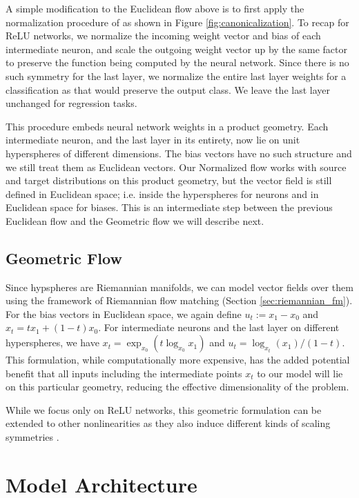 A simple modification to the Euclidean flow above is to first apply the normalization procedure of \citep{pittorinoDeepNetworksToroids2022} as shown in Figure \ref{fig:canonicalization}. To recap for ReLU networks, we normalize the incoming weight vector and bias of each intermediate neuron, and scale the outgoing weight vector up by the same factor to preserve the function being computed by the neural network. Since there is no such symmetry for the last layer, we normalize the entire last layer weights for a classification as that would preserve the output class. We leave the last layer unchanged for regression tasks. 

This procedure embeds neural network weights in a product geometry. Each intermediate neuron, and the last layer in its entirety, now lie on unit hyperspheres of different dimensions. The bias vectors have no such structure and we still treat them as Euclidean vectors. Our Normalized flow works with source and target distributions on this product geometry, but the vector field is still defined in Euclidean space; i.e. inside the hyperspheres for neurons and in Euclidean space for biases. This is an intermediate step between the previous Euclidean flow and the Geometric flow we will describe next. 

\subsection{Geometric Flow}

Since hypspheres are Riemannian manifolds, we can model vector fields over them using the framework of Riemannian flow matching \citep{chenRiemannianFlowMatching2023} (Section \ref{sec:riemannian_fm}). For the bias vectors in Euclidean space, we again define $u_t := x_1 - x_0$ and $x_t = t x_1 + (1-t) x_0$. For intermediate neurons and the last layer on different hyperspheres, we have $x_t = \exp_{x_0}(t \log_{x_0}x_1)$ and $u_t = \log_{x_t}(x_1) / (1-t)$. This formulation, while computationally more expensive, has the added potential benefit that all inputs including the intermediate points $x_t$ to our model will lie on this particular geometry, reducing the effective dimensionality of the problem. 

While we focus only on ReLU networks, this geometric formulation can be extended to other nonlinearities as they also induce different kinds of scaling symmetries \citep{godfreySymmetriesDeepLearning2022}. 

\section{Model Architecture}

